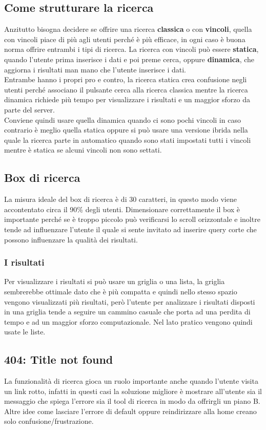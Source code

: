 \subsection{Come strutturare la ricerca}
Anzitutto bisogna decidere se offrire una ricerca \textbf{classica} o con \textbf{vincoli}, quella con vincoli piace di più agli utenti perché è più efficace, in ogni caso è buona norma offrire entrambi i tipi di ricerca.
La ricerca con vincoli può essere \textbf{statica}, quando l'utente prima inserisce i dati e poi preme cerca, oppure \textbf{dinamica}, che aggiorna i risultati man mano che l'utente inserisce i dati.\\
Entrambe hanno i propri pro e contro, la ricerca statica crea confusione negli utenti perché associano il pulsante cerca alla ricerca classica mentre la ricerca dinamica richiede più tempo per visualizzare i risultati e un maggior sforzo da parte del server.\\
Conviene quindi usare quella dinamica quando ci sono pochi vincoli in caso contrario è meglio quella statica oppure si può usare una versione ibrida nella quale la ricerca parte in automatico quando sono stati impostati tutti i vincoli mentre è statica se alcuni vincoli non sono settati.

\subsection{Box di ricerca}
La misura ideale del box di ricerca è di 30 caratteri, in questo modo viene accontentato circa il 90\% degli utenti.
Dimensionare correttamente il box è importante perché se è troppo piccolo può verificarsi lo scroll orizzontale e inoltre tende ad influenzare l'utente il quale si sente invitato ad inserire query corte che possono influenzare la qualità dei risultati.

\subsubsection{I risultati}
Per visualizzare i risultati si può usare un griglia o una lista, la griglia sembrerebbe ottimale dato che è più compatta e quindi nello stesso spazio vengono visualizzati più risultati, però l'utente per analizzare i risultati disposti in una griglia tende a seguire un cammino casuale che porta ad una perdita di tempo e ad un maggior sforzo computazionale.
Nel lato pratico vengono quindi usate le liste.

\subsection{404: Title not found}
La funzionalità di ricerca gioca un ruolo importante anche quando l'utente visita un link rotto, infatti in questi casi la soluzione migliore è mostrare all'utente sia il messaggio che spiega l'errore sia il tool di ricerca in modo da offrirgli un piano B.
Altre idee come lasciare l'errore di default oppure reindirizzare alla home creano solo confusione/frustrazione.

